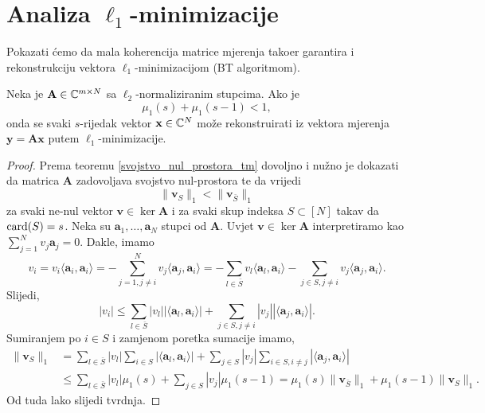 \documentclass[a4paper,twoside,12pt]{memoir} %
\newcommand{\vect}[1]{\mathbf{#1}}
\renewcommand{\vec}{\vect}
\newcommand{\card}{\text{\normalfont{card}}}
\newcommand{\norm}[1]{\|{#1}\|}
\begin{document}
\section[Analiza $\ell_1$-minimizacije][Analiza $\ell_1$-minimizacije]{Analiza $\ell_1$-minimizacije}
Pokazati \'cemo da mala koherencija matrice mjerenja tako\dj er garantira i rekonstrukciju vektora $\ell_1$-minimizacijom (BT algoritmom).
\begin{thm}\label{tm:5:15}
    Neka je $\vec A \in \C^{m \times N}$ sa $\ell_2$-normaliziranim stupcima. Ako je 
    \begin{equation}\label{5:13}
        \mu_1(s) + \mu_1(s-1) < 1, 
    \end{equation}
    onda se svaki $s$-rijedak vektor $\vec x \in \C^N$ mo\v{z}e rekonstruirati iz vektora mjerenja $\vec y = \vec{Ax}$ putem $\ell_1$-minimizacije.
\end{thm}
\begin{proof}
    Prema teoremu \ref{svojstvo_nul_prostora_tm} dovoljno i nu\v{z}no je dokazati da matrica $\vec A$ zadovoljava svojstvo nul-prostora te da vrijedi
    \begin{equation}\label{5:14}
        \norm{\vec v_S}_1 < \norm{\vec v_{\bar S}}_1 
    \end{equation}
    za svaki ne-nul vektor $\vec v \in \ker \vec A$ i za svaki skup indeksa $S \subset [N]$ takav da $\card(S) = s$. Neka su $\vec a_1, \dots, \vec a_N$ stupci od $\vec A$. Uvjet $\vec v \in \ker \vec A$ interpretiramo kao $\sum_{j=1}^N v_j \vec a_j = 0$. Dakle, imamo
    \begin{equation*}
        v_i = v_i \langle \vec a_i, \vec a_i \rangle = - \sum_{j=1,j \neq i}^N v_j \langle \vec a_j, \vec a_i \rangle = - \sum_{l \in \bar S}v_l \langle \vec a_l, \vec a_i \rangle - \sum_{j \in S,j \neq i} v_j \langle \vec a_j, \vec a_i \rangle.
    \end{equation*}
    Slijedi,
    \begin{equation*}
        |v_i| \leq \sum_{l \in \bar S}|v_l||\langle \vec a_l, \vec a_i\rangle| + \sum_{j \in S, j \neq i} |v_j||\langle \vec a_j, \vec a_i \rangle|.
    \end{equation*}
    Sumiranjem po $i \in S$ i zamjenom poretka sumacije imamo,
    \begin{align*}
        \norm{\vec v_S}_1 &= \sum_{l \in \bar S}|v_l|\sum_{i \in S} |\langle \vec a_l, \vec a_i \rangle| + \sum_{j \in S}|v_j| \sum_{i \in S,i \neq j}|\langle \vec a_j, \vec a_i \rangle| \\
        &\leq \sum_{l \in \bar S} |v_l| \mu_1(s) + \sum_{j \in S}|v_j| \mu_1(s-1) = \mu_1(s) \norm{\vec v_{\bar S}}_1 + \mu_1(s-1) \norm{\vec v_S}_1.
    \end{align*}
    Od tuda lako slijedi tvrdnja.
\end{proof}
\end{document}

